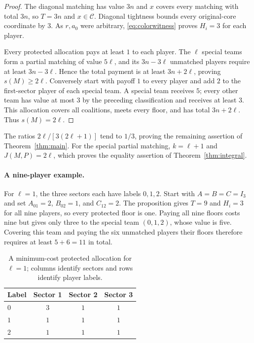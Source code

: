 \documentclass[11pt]{article}
\theoremstyle{remark}
\newcommand{\core}{\mathcal C}
\begin{document}
\begin{proof}
The diagonal matching has value $3n$ and $x$ covers every matching with
total $3n$, so $T=3n$ and $x\in\core$. Diagonal tightness bounds every
original-core coordinate by $3$. As $r,a_0$ were arbitrary,
\eqref{eq:colorwitness} proves $H_i=3$ for each player.

Every protected allocation pays at least $1$ to each player. The $\ell$
special teams form a partial matching of value $5\ell$, and its
$3n-3\ell$ unmatched players require at least $3n-3\ell$. Hence the
total payment is at least $3n+2\ell$, proving $s(M)\ge2\ell$.
Conversely start with payoff $1$ to every player and add $2$ to the
first-sector player of each special team. A special team receives $5$;
every other team has value at most $3$ by the preceding classification
and receives at least $3$. This allocation covers all coalitions, meets
every floor, and has total $3n+2\ell$. Thus $s(M)=2\ell$.
\end{proof}

The ratios $2\ell/[3(2\ell+1)]$ tend to $1/3$, proving the remaining
assertion of Theorem~\ref{thm:main}. For the special partial matching,
$k=\ell+1$ and $J(M,P)=2\ell$, which proves the equality assertion
of Theorem~\ref{thm:integral}.

\paragraph{A nine-player example.}
For $\ell=1$, the three sectors each have labels $0,1,2$. Start with
$A=B=C=I_3$ and set $A_{01}=2$, $B_{02}=1$, and $C_{12}=2$.
The proposition gives $T=9$ and $H_i=3$ for all nine players, so every
protected floor is one. Paying all nine floors costs nine but gives only
three to the special team $(0,1,2)$, whose value is five. Covering this
team and paying the six unmatched players their floors therefore requires
at least $5+6=11$ in total.

\begin{table}[htbp]
\centering
\caption{A minimum-cost protected allocation for $\ell=1$;
columns identify sectors and rows identify player labels.}
\label{tab:small-subsidy}
\begin{tabular}{lccc}\toprule
Label & Sector 1 & Sector 2 & Sector 3\\\midrule
$0$ & $3$ & $1$ & $1$\\
$1$ & $1$ & $1$ & $1$\\
$2$ & $1$ & $1$ & $1$\\\bottomrule
\end{tabular}
\end{table}
\end{document}
